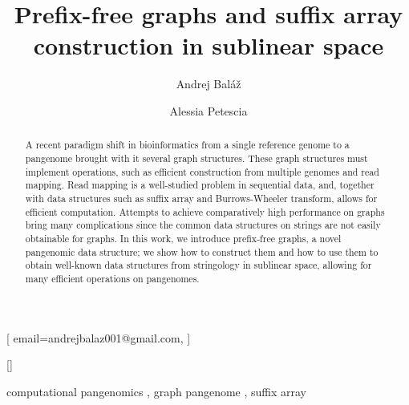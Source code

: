 \documentclass[twocolumn]{ceurart}
\begin{document}


\title{Prefix-free graphs and suffix array construction in sublinear space}

\author[1]{Andrej Baláž}[
    email=andrejbalaz001@gmail.com,
]
\cormark[1]

\author[1]{Alessia Petescia}[]

\address[1]{
    Department of Applied Informatics,
    Faculty of Mathematics, Physics and Informatics,
    Comenius University, Bratislava, Slovakia
}


\begin{abstract}
A recent paradigm shift in bioinformatics from a single reference genome to a pangenome brought with it several graph structures.
These graph structures must implement operations, such as efficient construction from multiple genomes and read mapping.
Read mapping is a well-studied problem in sequential data, and, together with data structures such as suffix array and Burrows-Wheeler transform, allows for efficient computation.
Attempts to achieve comparatively high performance on graphs bring many complications since the common data structures on strings are not easily obtainable for graphs.
In this work, we introduce prefix-free graphs, a novel pangenomic data structure; we show how to construct them and how to use them to obtain well-known data structures from stringology in sublinear space, allowing for many efficient operations on pangenomes.
\end{abstract}

\begin{keywords}
    computational pangenomics \sep
    graph pangenome \sep
    suffix array
\end{keywords}

\maketitle
\end{document}
